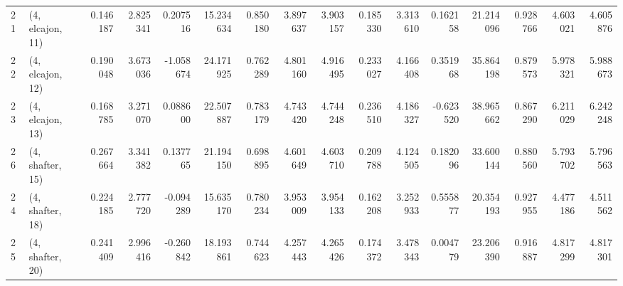 \begin{tabular}{llrrrrrrrrrrrrrr}
21 &  (4, elcajon, 11) &   0.146187 &  2.825341 &  0.207516 &  15.234634 &  0.850180 &   3.897637 &  3.903157 &  0.185330 &  3.313610 &  0.162158 &   21.214096 &  0.928766 &   4.603021 &   4.605876 \\
22 &  (4, elcajon, 12) &   0.190048 &  3.673036 & -1.058674 &  24.171925 &  0.762289 &   4.801160 &  4.916495 &  0.233027 &  4.166408 &  0.351968 &   35.864198 &  0.879573 &   5.978321 &   5.988673 \\
23 &  (4, elcajon, 13) &   0.168785 &  3.271070 &  0.088600 &  22.507887 &  0.783179 &   4.743420 &  4.744248 &  0.236510 &  4.186327 & -0.623520 &   38.965662 &  0.867290 &   6.211029 &   6.242248 \\
26 &  (4, shafter, 15) &   0.267664 &  3.341382 &  0.137765 &  21.194150 &  0.698895 &   4.601649 &  4.603710 &  0.209788 &  4.124505 &  0.182096 &   33.600144 &  0.880560 &   5.793702 &   5.796563 \\
24 &  (4, shafter, 18) &   0.224185 &  2.777720 & -0.094289 &  15.635170 &  0.780234 &   3.953009 &  3.954133 &  0.162208 &  3.252933 &  0.555877 &   20.354193 &  0.927955 &   4.477186 &   4.511562 \\
25 &  (4, shafter, 20) &   0.241409 &  2.996416 & -0.260842 &  18.193861 &  0.744623 &   4.257443 &  4.265426 &  0.174372 &  3.478343 &  0.004779 &   23.206390 &  0.916887 &   4.817299 &   4.817301 \\
\bottomrule
\end{tabular}
